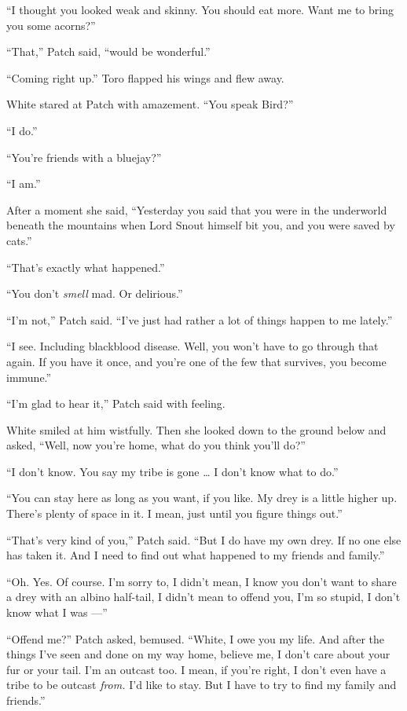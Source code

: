 \documentclass[12pt]{memoir}
\begin{document}
“I thought you looked weak and skinny. You should eat more. Want me to
bring you some acorns?”

“That,” Patch said, “would be wonderful.”

“Coming right up.” Toro flapped his wings and flew away.

White stared at Patch with amazement. “You speak Bird?”

“I do.”

“You’re friends with a bluejay?”

“I am.”

After a moment she said, “Yesterday you said that you were in the
underworld beneath the mountains when Lord Snout himself bit you, and
you were saved by cats.”

“That’s exactly what happened.”

“You don’t \textit{smell} mad. Or delirious.”

“I’m not,” Patch said. “I’ve just had rather a lot of things happen to
me lately.”

“I see. Including blackblood disease. Well, you won’t have to go
through that again. If you have it once, and you’re one of the few
that survives, you become immune.”

“I’m glad to hear it,” Patch said with feeling.

White smiled at him wistfully. Then she looked down to the ground
below and asked, “Well, now you’re home, what do you think you’ll do?”

“I don’t know. You say my tribe is gone … I don’t know what to do.”

“You can stay here as long as you want, if you like. My drey is a
little higher up. There’s plenty of space in it. I mean, just until
you figure things out.”

“That’s very kind of you,” Patch said. “But I do have my own drey. If
no one else has taken it. And I need to find out what happened to my
friends and family.”

“Oh. Yes. Of course. I’m sorry to, I didn’t mean, I know you don’t
want to share a drey with an albino half-tail, I didn’t mean to offend
you, I’m so stupid, I don’t know what I was —”

“Offend me?” Patch asked, bemused. “White, I owe you my life. And
after the things I’ve seen and done on my way home, believe me, I
don’t care about your fur or your tail. I’m an outcast too. I mean, if
you’re right, I don’t even have a tribe to be outcast \textit{from.}
I’d like to stay. But I have to try to find my family and friends.”
\end{document}
